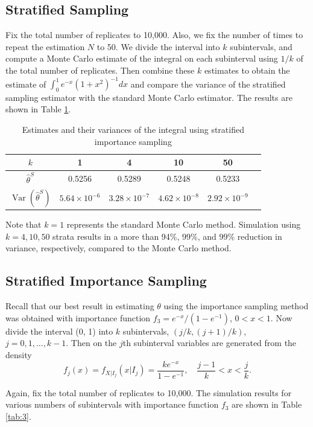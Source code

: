 \documentclass[11pt]{article}
\begin{document}
\subsection{Stratified Sampling}
Fix the total number of replicates to 10,000. Also, we fix the number of times to repeat the estimation $N$ to 50. We divide the interval into $k$ subintervals, and compute a Monte Carlo estimate of the integral on each subinterval using $1/k$ of the total number of replicates. Then combine these $k$ estimates to obtain the estimate of $\int_0^1e^{-x}(1+x^2)^{-1}dx$ and compare the variance of the stratified sampling estimator with the standard Monte Carlo estimator. The results are shown in Table \ref{tab:2}.

\begin{table}[h!]
\centering
\caption{Estimates and their variances of the integral using stratified importance sampling}\label{tab:2}
\begin{tabular}{cccccc}
\toprule
$k$ & 1 & 4 & 10 & 50\\
\midrule
$\widehat{\theta}^S$ & 0.5256 & 0.5289 & 0.5248 & 0.5233\\
$\operatorname{Var}\left(\widehat{\theta}^S\right)$ & $5.64\times10^{-6}$ & $3.28\times10^{-7}$ & $4.62\times10^{-8}$ & $2.92\times10^{-9}$\\
\bottomrule
\end{tabular}
\end{table}

Note that $k=1$ represents the standard Monte Carlo method. Simulation using $k=4, 10, 50$ strata results in a more than 94\%, 99\%, and 99\% reduction in variance, respectively, compared to the Monte Carlo method.

\subsection{Stratified Importance Sampling}
Recall that our best result in estimating $\theta$ using the importance sampling method was obtained with importance function $f_3=e^{-x}/(1-e^{-1})$, $0<x<1$. Now divide the interval (0, 1) into $k$ subintervals, $(j/k, (j+1)/k)$, $j=0, 1, \ldots, k-1$. Then on the $j$th subinterval variables are generated from the density
\[
f_j(x)=f_{X|I_j}(x|I_j)=\frac{ke^{-x}}{1-e^{-1}}, \quad\frac{j-1}{k}<x<\frac{j}{k}.
\]

Again, fix the total number of replicates to 10,000. The simulation results for various numbers of subintervals with importance function $f_3$ are shown in Table \ref{tab:3}.
\end{document}
